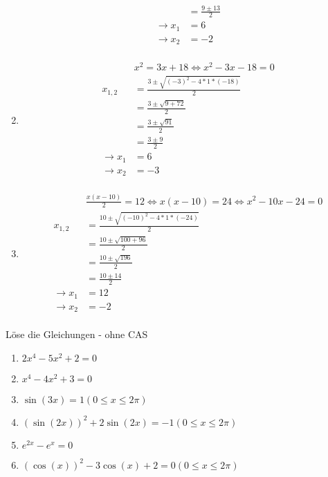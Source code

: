 \begin{lsg}{}
\begin{enumerate}
\begin{align*}
        &=\frac{9\pm13}{2}\\
        \rightarrow x_1&=6\\
        \rightarrow x_2&=-2\\
      \end{align*}
      \item
      \begin{align*}
        &x^2 = 3x + 18 \Leftrightarrow x^2 - 3x - 18 = 0\\
        x_{1,2}&=\frac{3\pm\sqrt{(-3)^2-4*1*(-18)}}{2}\\
        &=\frac{3\pm\sqrt{9+72}}{2}\\
        &=\frac{3\pm\sqrt{91}}{2}\\
        &=\frac{3\pm9}{2}\\
        \rightarrow x_1&=6\\
        \rightarrow x_2&=-3\\
      \end{align*}
      \item
      \begin{align*}
        &\frac{x(x-10)}{2} = 12 \Leftrightarrow x(x-10)=24 \Leftrightarrow x^2 - 10x - 24 = 0\\
        x_{1,2}&=\frac{10\pm\sqrt{(-10)^2-4*1*(-24)}}{2}\\
        &=\frac{10\pm\sqrt{100+96}}{2}\\
        &=\frac{10\pm\sqrt{196}}{2}\\
        &=\frac{10\pm14}{2}\\
        \rightarrow x_1&=12\\
        \rightarrow x_2&=-2\\
      \end{align*}
    \end{enumerate}
\end{lsg}




 Löse die Gleichungen - ohne CAS
\begin{multicols}{3}
  \begin{enumerate}
    \item $2x^4 - 5x^2 + 2 = 0$
    \item $x^4 - 4x^2 + 3 = 0$
    \item $\sin(3x) = 1 (0\leq x \leq 2\pi)$
    \item $(\sin(2x))^2 + 2\sin(2x) = -1 (0\leq x \leq 2\pi)$
    \item $e^{2x} - e^x = 0$
		\item $\left(\cos(x)\right)^2-3\cos(x)+2=0 (0\leq x \leq 2\pi)$
  \end{enumerate}
\end{multicols}

